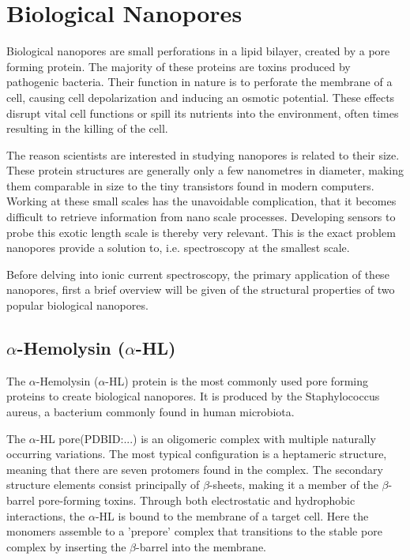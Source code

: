 \section{Biological Nanopores}

Biological nanopores are small perforations in a lipid bilayer, created
by a pore forming protein.  The majority of these proteins are toxins produced by
pathogenic bacteria. Their function in nature is to perforate the membrane of a cell,
causing cell depolarization and inducing an osmotic potential. These effects disrupt
vital cell functions or spill its nutrients into the environment, often times resulting
in the killing of the cell.

The reason scientists are interested in studying nanopores is related to their size.
These protein structures are generally only a few nanometres in diameter, making them
comparable in size to the tiny transistors found in modern computers.
Working at these small scales has the unavoidable complication, that it becomes difficult
to retrieve information from nano scale processes.
Developing sensors to probe this exotic length scale is thereby very relevant. This is
the exact problem nanopores provide a solution to, i.e. spectroscopy at the smallest
scale.

Before delving into ionic current spectroscopy, the primary application of these
nanopores, first a brief overview will be given of the structural properties of two
popular biological nanopores.

\subsection{$\alpha$-Hemolysin ($\alpha$-HL)}

The $\alpha$-Hemolysin ($\alpha$-HL) protein is the most commonly used pore forming
proteins to create biological nanopores. It is produced by the Staphylococcus aureus, a
bacterium commonly found in human microbiota.

The $\alpha$-HL pore(PDBID:...) is an oligomeric complex with multiple naturally
occurring variations. The most typical configuration
is a heptameric structure, meaning that there are seven protomers found in the complex.
The secondary structure elements consist principally of $\beta$-sheets, making it a
member
of the $\beta$-barrel pore-forming toxins. Through both electrostatic and hydrophobic
interactions, the $\alpha$-HL is bound to the membrane of a target cell. Here the
monomers assemble to a 'prepore' complex that transitions to the stable pore complex by
inserting the $\beta$-barrel into the membrane.

